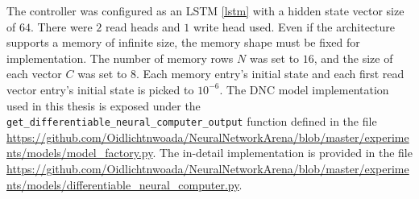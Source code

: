 \documentclass[draft,final]{vutinfth} %
\begin{document}
    The controller was configured as an LSTM \ref{lstm} with a hidden state vector size of $64$. There were $2$ read heads and $1$ write head used.
    Even if the architecture supports a memory of infinite size, the memory shape must be fixed for implementation.
    The number of memory rows $N$ was set to $16$, and the size of each vector $C$ was set to $8$.
    Each memory entry's initial state and each first read vector entry's initial state is picked to $10^{-6}$.
    The DNC model implementation used in this thesis is exposed under the \texttt{get\_differentiable\_neural\_computer\_output} function defined in the file \url{https://github.com/Oidlichtnwoada/NeuralNetworkArena/blob/master/experiments/models/model_factory.py}.
    The in-detail implementation is provided in the file \url{https://github.com/Oidlichtnwoada/NeuralNetworkArena/blob/master/experiments/models/differentiable_neural_computer.py}.
\end{document}
